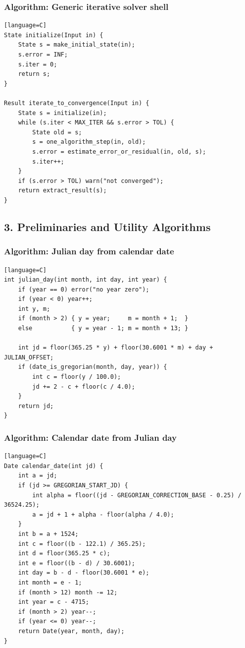 \documentclass[11pt]{article}
\begin{document}
\subsubsection{Algorithm: Generic iterative solver shell}\label{algorithm-generic-iterative-solver-shell}

\begin{verbatim}[language=C]
State initialize(Input in) {
    State s = make_initial_state(in);
    s.error = INF;
    s.iter = 0;
    return s;
}

Result iterate_to_convergence(Input in) {
    State s = initialize(in);
    while (s.iter < MAX_ITER && s.error > TOL) {
        State old = s;
        s = one_algorithm_step(in, old);
        s.error = estimate_error_or_residual(in, old, s);
        s.iter++;
    }
    if (s.error > TOL) warn("not converged");
    return extract_result(s);
}
\end{verbatim}

\subsection{3. Preliminaries and Utility Algorithms}\label{preliminaries-and-utility-algorithms}

\subsubsection{Algorithm: Julian day from calendar date}\label{algorithm-julian-day-from-calendar-date}

\begin{verbatim}[language=C]
int julian_day(int month, int day, int year) {
    if (year == 0) error("no year zero");
    if (year < 0) year++;
    int y, m;
    if (month > 2) { y = year;     m = month + 1;  }
    else           { y = year - 1; m = month + 13; }

    int jd = floor(365.25 * y) + floor(30.6001 * m) + day + JULIAN_OFFSET;
    if (date_is_gregorian(month, day, year)) {
        int c = floor(y / 100.0);
        jd += 2 - c + floor(c / 4.0);
    }
    return jd;
}
\end{verbatim}

\subsubsection{Algorithm: Calendar date from Julian day}\label{algorithm-calendar-date-from-julian-day}

\begin{verbatim}[language=C]
Date calendar_date(int jd) {
    int a = jd;
    if (jd >= GREGORIAN_START_JD) {
        int alpha = floor((jd - GREGORIAN_CORRECTION_BASE - 0.25) / 36524.25);
        a = jd + 1 + alpha - floor(alpha / 4.0);
    }
    int b = a + 1524;
    int c = floor((b - 122.1) / 365.25);
    int d = floor(365.25 * c);
    int e = floor((b - d) / 30.6001);
    int day = b - d - floor(30.6001 * e);
    int month = e - 1;
    if (month > 12) month -= 12;
    int year = c - 4715;
    if (month > 2) year--;
    if (year <= 0) year--;
    return Date(year, month, day);
}
\end{verbatim}
\end{document}
